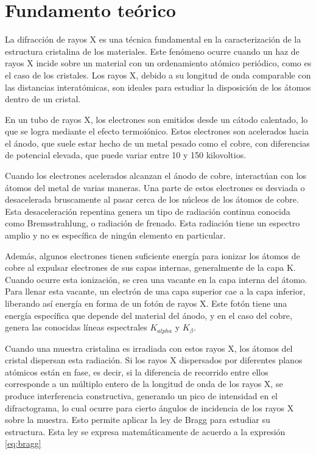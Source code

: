 \section{Fundamento teórico}
La difracción de rayos X es una técnica fundamental en la caracterización de la estructura cristalina de los materiales. Este fenómeno ocurre cuando un haz de rayos X incide sobre un material con un ordenamiento atómico periódico, como es el caso de los cristales. Los rayos X, debido a su longitud de onda comparable con las distancias interatómicas, son ideales para estudiar la disposición de los átomos dentro de un cristal.

\vspace{\baselineskip}

En un tubo de rayos X, los electrones son emitidos desde un cátodo calentado, lo que se logra mediante el efecto termoiónico. Estos electrones son acelerados hacia el ánodo, que suele estar hecho de un metal pesado como el cobre, con diferencias de potencial elevada, que puede variar entre 10 y 150 kilovoltios.

\vspace{\baselineskip}

Cuando los electrones acelerados alcanzan el ánodo de cobre, interactúan con los átomos del metal de varias maneras. Una parte de estos electrones es desviada o desacelerada bruscamente al pasar cerca de los núcleos de los átomos de cobre. Esta desaceleración repentina genera un tipo de radiación continua conocida como Bremsstrahlung, o radiación de frenado. Esta radiación tiene un espectro amplio y no es específica de ningún elemento en particular.

\vspace{\baselineskip}

Además, algunos electrones tienen suficiente energía para ionizar los átomos de cobre al expulsar electrones de sus capas internas, generalmente de la capa K. Cuando ocurre esta ionización, se crea una vacante en la capa interna del átomo. Para llenar esta vacante, un electrón de una capa superior cae a la capa inferior, liberando así energía en forma de un fotón de rayos X. Este fotón tiene una energía específica que depende del material del ánodo, y en el caso del cobre, genera las conocidas líneas espectrales $K_{alpha}$ y $K_{\beta}$.

\vspace{\baselineskip}

Cuando una muestra cristalina es irradiada con estos rayos X, los átomos del cristal dispersan esta radiación. Si los rayos X dispersados por diferentes planos atómicos están en fase, es decir, si la diferencia de recorrido entre ellos corresponde a un múltiplo entero de la longitud de onda de los rayos X, se produce interferencia constructiva, generando un pico de intensidad en el difractograma, lo cual ocurre para cierto ángulos de incidencia de los rayos X sobre la muestra. Esto  permite aplicar la ley de Bragg para estudiar su estructura. Esta ley se expresa matemáticamente de acuerdo a la expresión \ref{eq:bragg}



